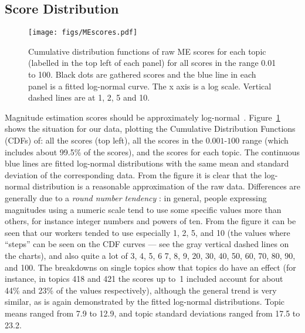 \subsection{Score Distribution}
\label{sec:score-distribution}

\begin{figure}[t]
  \centering
  \texttt{[image: figs/MEscores.pdf]}
  \caption{Cumulative distribution functions of raw ME scores for each topic 
(labelled in the top left of each panel) for all scores in the range
0.01 to 100. Black dots are gathered scores and the blue line in each panel is a 
fitted log-normal curve. The x axis is a log scale. 
Vertical dashed lines are at 1, 2, 5 and 10.}
  \label{fig:ME-raw-scores}
\end{figure}

Magnitude estimation scores should be approximately
log-normal~\citep{Mar74,moskowitz:1977}. 
Figure~\ref{fig:ME-raw-scores} shows the situation for our data, 
plotting the Cumulative Distribution Functions (CDFs) of:
all the scores (top left), all the scores in the $0.001$-$100$ range
(which includes about 99.5\% of the scores), and the scores for each
topic. 
The continuous blue lines are fitted log-normal distributions with the
same mean and standard deviation of the corresponding data.  
From the figure it is clear that the log-normal distribution is a
reasonable approximation of the raw data. 
Differences are generally due to a \emph{round number tendency}
\cite{moskowitz:1977}: in general, people expressing magnitudes using
a numeric scale tend to use some specific values more than others, for
instance integer numbers and powers of ten. 
From the figure it can be seen that our workers tended to use
especially 1, 2, 5, and 10 (the values where ``steps'' can be seen on
the CDF curves --- see the gray vertical dashed lines on the charts),
and also quite a lot of 3, 4, 5, 6 7, 8, 9, 20, 30, 40, 50, 60, 70,
80, 90, and 100. 
The breakdowns on single topics show that topics do have an effect
(for instance, in topics 418 and 421 the scores up to~1 included
account for about 44\% and 23\% of the values respectively), although
the general trend is very similar, as is again demonstrated by the
fitted log-normal distributions.
Topic means ranged from 7.9 to 12.9, and topic standard deviations ranged
from 17.5 to 23.2.


